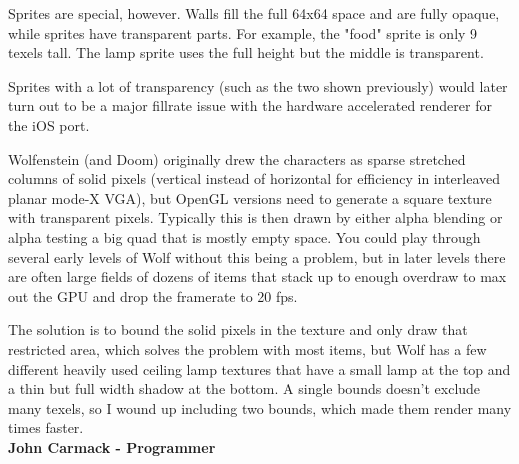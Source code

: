 Sprites are special, however. Walls fill the full 64x64 space and are fully opaque, while sprites have transparent parts. For example, the "food" sprite is only 9 texels tall. The lamp sprite uses the full height but the middle is transparent.\\


  \begin{minipage}{.5\textwidth} 
   \end{minipage}
  \begin{minipage}{.5\textwidth} 
   \end{minipage}

\par
\vspace{4mm}
 Sprites with a lot of transparency (such as the two shown previously) would later turn out to be a major fillrate issue with the hardware accelerated renderer for the iOS port.\\
\par
\begin{fancyquotes}
Wolfenstein (and Doom) originally drew the characters as sparse stretched columns of solid pixels (vertical instead of horizontal for efficiency in interleaved planar mode-X VGA), but OpenGL versions need to generate a square texture with transparent pixels.  Typically this is then drawn by either alpha blending or alpha testing a big quad that is mostly empty space.  You could play through several early levels of Wolf without this being a problem, but in later levels there are often large fields of dozens of items that stack up to enough overdraw to max out the GPU and drop the framerate to 20 fps.\\
\par  The solution is to bound the solid pixels in the texture and only draw that restricted area, which solves the problem with most items, but Wolf has a few different heavily used ceiling lamp textures that have a small lamp at the top and a thin but full width shadow at the bottom.  A single bounds doesn't exclude many texels, so I wound up including two bounds, which made them render many times faster. 
\bigskip \\
\textbf{John Carmack - Programmer}
 \end{fancyquotes}

\par













